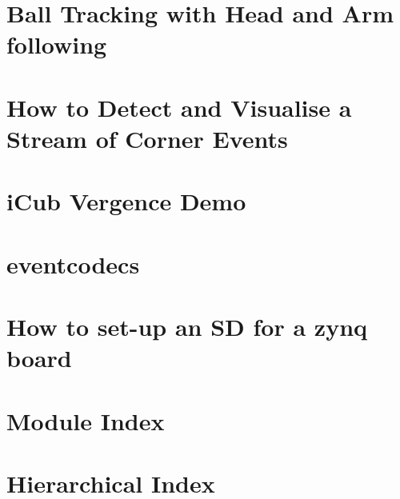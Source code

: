 \documentclass[twoside]{book}
\newcommand{\+}{\discretionary{\mbox{\scriptsize$\hookleftarrow$}}{}{}}
\begin{document}
\chapter{Ball Tracking with Head and Arm following}
\label{md__home_aglover_workspace_projects_event-driven_documentation_4balldemo}
\hypertarget{md__home_aglover_workspace_projects_event-driven_documentation_4balldemo}{}

\chapter{How to Detect and Visualise a Stream of Corner Events}
\label{md__home_aglover_workspace_projects_event-driven_documentation_5corners}
\hypertarget{md__home_aglover_workspace_projects_event-driven_documentation_5corners}{}

\chapter{i\+Cub Vergence Demo}
\label{md__home_aglover_workspace_projects_event-driven_documentation_6vergence}
\hypertarget{md__home_aglover_workspace_projects_event-driven_documentation_6vergence}{}

\chapter{eventcodecs}
\label{md__home_aglover_workspace_projects_event-driven_documentation_eventcodecs}
\hypertarget{md__home_aglover_workspace_projects_event-driven_documentation_eventcodecs}{}

\chapter{How to set-\/up an SD for a zynq board}
\label{md__home_aglover_workspace_projects_event-driven_documentation_howtosetupSD}
\hypertarget{md__home_aglover_workspace_projects_event-driven_documentation_howtosetupSD}{}

\chapter{Module Index}

\chapter{Hierarchical Index}

\end{document}
